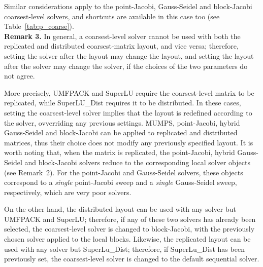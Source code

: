 Similar considerations apply to the point-Jacobi, Gauss-Seidel and block-Jacobi
coarsest-level solvers, and shortcuts are available
in this case too (see Table~\ref{tab:p_coarse}). \\

\textbf{Remark 3.} In general, a coarsest-level solver cannot be used with
both the replicated and distributed coarsest-matrix layout, and vice versa;
therefore, setting the solver after the layout may change the layout, and setting
the layout after the solver may change the solver, if the choices of the two
parameters do not agree. 

More precisely, UMFPACK and SuperLU require the coarsest-level
matrix to be replicated, while SuperLU\_Dist requires it to be distributed.
In these cases, setting the coarsest-level solver implies that
the layout is redefined according to the solver, ovverriding any
previous settings. MUMPS,  point-Jacobi,
hybrid Gauss-Seidel and block-Jacobi can be applied to
replicated and distributed matrices, thus their choice
does not modify any previously specified layout.
It is worth noting that, when the matrix is replicated,
the point-Jacobi, hybrid Gauss-Seidel and block-Jacobi solvers
reduce to the corresponding local solver objects (see Remark~2).
For the point-Jacobi and Gauss-Seidel solvers, these objects
correspond to a \emph{single} point-Jacobi sweep and a \emph{single} 
Gauss-Seidel sweep, respectively, which are very poor solvers.

On the other hand, the distributed layout can be used with any solver
but UMFPACK and SuperLU; therefore, if any of these two solvers has already
been selected, the coarsest-level solver is changed to block-Jacobi,
with the previously chosen solver applied to the local blocks.
Likewise, the replicated layout can be used with any solver but SuperLu\_Dist;
therefore, if SuperLu\_Dist has been previously set, the coarsest-level
solver is changed to the default sequential solver.




